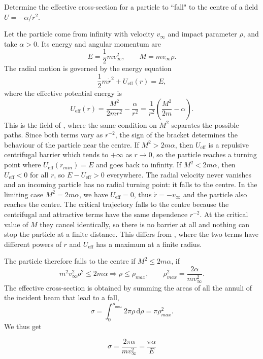 \begin{problem}[title={Fall to the centre in an inverse-square field}]
{
Determine the effective cross-section for a particle to ``fall" to the centre of a field $U=-\alpha/r^2$.
}
{
Let the particle come from infinity with velocity $v_\infty$ and impact parameter $\rho$, and take $\alpha > 0$. Its energy and angular momentum are
\begin{equation*}
    E = \frac{1}{2}mv_\infty^2, \qquad M = mv_\infty\rho.
\end{equation*}
The radial motion is governed by the energy equation
\begin{equation*}
    \frac{1}{2}m\dot{r}^2 + U_{\text{eff}}(r) = E,
\end{equation*}
where the effective potential energy is
\begin{equation*}
    U_{\text{eff}}(r) = \frac{M^2}{2mr^2} - \frac{\alpha}{r^2} = \frac{1}{r^2}\left( \frac{M^2}{2m} - \alpha \right).
\end{equation*}
This is the field of , where the same condition on $M^2$ separates the possible paths. Since both terms vary as $r^{-2}$, the sign of the bracket determines the behaviour of the particle near the centre. If $M^2 > 2m\alpha$, then $U_{\text{eff}}$ is a repulsive centrifugal barrier which tends to $+\infty$ as $r \to 0$, so the particle reaches a turning point where $U_{\text{eff}}(r_{min}) = E$ and goes back to infinity. If $M^2 < 2m\alpha$, then $U_{\text{eff}} < 0$ for all $r$, so $E - U_{\text{eff}} > 0$ everywhere. The radial velocity never vanishes and an incoming particle has no radial turning point: it falls to the centre. In the limiting case $M^2 = 2m\alpha$, we have $U_{\text{eff}} = 0$, thus $\dot{r} = -v_\infty$ and the particle also reaches the centre. The critical trajectory falls to the centre because the centrifugal and attractive terms have the same dependence $r^{-2}$. At the critical value of $M$ they cancel identically, so there is no barrier at all and nothing can stop the particle at a finite distance. This differs from , where the two terms have different powers of $r$ and $U_{\text{eff}}$ has a maximum at a finite radius.

The particle therefore falls to the centre if $M^2 \leq 2m\alpha$, \ie if
\begin{equation*}
    m^2v_\infty^2\rho^2 \leq 2m\alpha \Rightarrow \rho \leq \rho_{max}, \qquad \rho_{max}^2 = \frac{2\alpha}{mv_\infty^2}.
\end{equation*}
The effective cross-section is obtained by summing the areas of all the annuli of the incident beam that lead to a fall,
\begin{equation*}
    \sigma = \int_0^{\rho_{max}} 2\pi\rho\,\mathrm{d}\rho = \pi\rho_{max}^2.
\end{equation*}
We thus get
}
{
\begin{equation*}
    \sigma = \frac{2\pi\alpha}{mv_\infty^2} = \frac{\pi\alpha}{E}
\end{equation*}
}
\end{problem}

